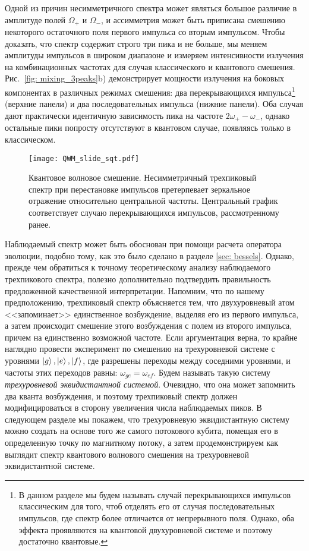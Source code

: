 Одной из причин несимметричного спектра может являться большое различие в амплитуде полей $\Omega_+$ и $\Omega_-$, и ассимметрия может быть приписана смешению некоторого остаточного поля первого импульса со вторым импульсом. Чтобы доказать, что спектр содержит строго три пика и не больше, мы меняем амплитуды импульсов в широком диапазоне и измеряем интенсивности излучения на комбинационных частотах для случая классического и квантового смешения. Рис.~\ref{fig: mixing_3peaks}b) демонстрирует мощности излучения на боковых компонентах в различных режимах смешения: два перекрывающихся импульса\footnote{В данном разделе мы будем называть случай перекрывающихся импульсов классическим для того, чтоб отделять его от случая последовательных импульсов, где спектр более отличается от непрерывного поля. Однако, оба эффекта проявляются на квантовой двухуровневой системе и поэтому достаточно квантовые.} (верхние панели) и два последовательных импульса (нижние панели). Оба случая дают практически идентичную зависимость пика на частоте  $2\omega_+ - \omega_-$, однако остальные пики попросту отсутствуют в квантовом случае, появляясь только в классическом. 
\begin{figure}[th]
\centering
\texttt{[image: QWM\_slide\_sqt.pdf]}
\caption[Квантовое волновое смешение в зависимость от порядка импульсов]{Квантовое волновое смешение. Несимметричный трехпиковый спектр при перестановке импульсов претерпевает зеркальное отражение относительно центральной частоты. Центральный график соответствует случаю перекрывающихся импульсов, рассмотренному ранее. }
\label{fig: mixing_mirror}
\end{figure}

Наблюдаемый спектр может быть обоснован при помощи расчета оператора эволюции, подобно тому, как это было сделано в разделе \ref{sec: bessels}. Однако, прежде чем обратиться к точному теоретическому анализу наблюдаемого трехпикового спектра, полезно дополнительно подтвердить правильность предложенной качественной интерпретации. Напомним, что по нашему предположению, трехпиковый спектр объясняется тем, что двухуровневый атом <<запоминает>> единственное возбуждение, выделяя его из первого импульса, а затем происходит смешение этого возбуждения с полем из второго импульса, причем на единственно возможной частоте. Если аргументация верна, то крайне наглядно провести эксперимент по смешению на трехуровневой системе с уровнями $\ket{g}, \ket{e}, \ket{f}$, где разрешены переходы между соседними уровнями, и частоты этих переходов равны: $\omega_{ge} = \omega_{ef}$. Будем называть такую систему \textit{трехуровневой эквидистантной системой}. Очевидно, что она может запомнить два кванта возбуждения, и поэтому трехпиковый спектр должен модифицироваться в сторону увеличения числа наблюдаемых пиков. В следующем разделе мы покажем, что трехуровневую эквидистантную систему можно создать на основе того же самого потокового кубита, помещая его в определенную точку по магнитному потоку, а затем продемонстрируем как выглядит спектр квантового волнового смешения на трехуровневой эквидистантной системе. 
